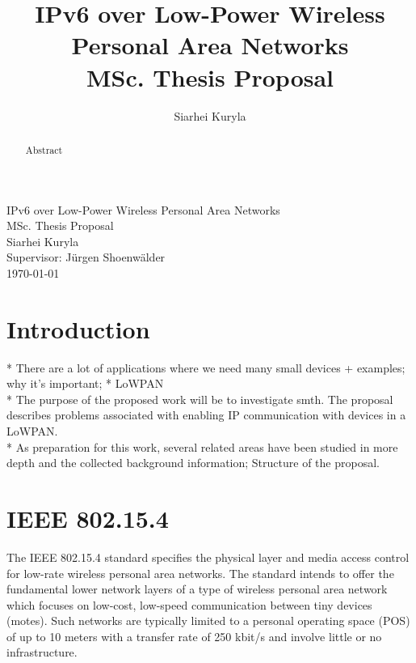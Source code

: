 \documentclass[12pt, titlepage, a4paper]{report}
\title{IPv6 over Low-Power Wireless Personal Area Networks\\ MSc. Thesis Proposal}
\author{Siarhei Kuryla}
\begin{document}
\begin{titlepage}
 
\begin{center}
 
 
\huge IPv6 over Low-Power Wireless Personal Area Networks\\ [0.5cm]
 
\Large MSc. Thesis Proposal\\ [0.5cm]
Siarhei Kuryla\\ [0.5cm]

\large Supervisor: J\"urgen Shoenw\"alder\\[0.5cm]
{\large \today}

 
\end{center} 
\end{titlepage}

\newpage
\thispagestyle{empty}

\newpage
\begin{abstract}
Abstract
\end{abstract}

\newpage
\tableofcontents
\newpage 

\chapter{Introduction}
* There are a lot of applications where we need many small devices + examples; why it's important;
* LoWPAN\\
* The purpose of the proposed work will be to investigate smth. The proposal describes problems associated with enabling IP communication with devices in a LoWPAN.\\
* As preparation for this work, several related areas have been studied in more
depth and the collected background information; Structure of the proposal.\\

\chapter{IEEE 802.15.4}
The IEEE 802.15.4 standard \cite{ieee802.15.4} specifies the physical layer and media access control for low-rate wireless personal area networks. The standard intends to offer the fundamental lower network layers of a type of wireless personal area network which focuses on low-cost, low-speed communication between tiny devices (motes). Such networks are typically limited to a personal operating space (POS) of up to 10 meters with a transfer rate of 250 kbit/s and involve little or no infrastructure. 
\end{document}
